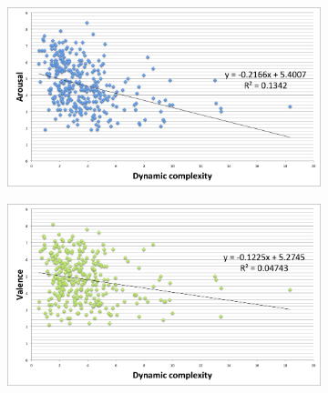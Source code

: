 \begin{figure}
         \centering
        \begin{subfigure}[b]{0.48\textwidth}
                \includegraphics[width=\textwidth]{Figures/dynamiccomplexity-arousal}
			   \vspace{20pt}
        \end{subfigure}
        \begin{subfigure}[b]{0.48\textwidth}
                \includegraphics[width=\textwidth]{Figures/dynamiccomplexity-valence}
                  \vspace{20pt}
        \end{subfigure}
\end{figure}

